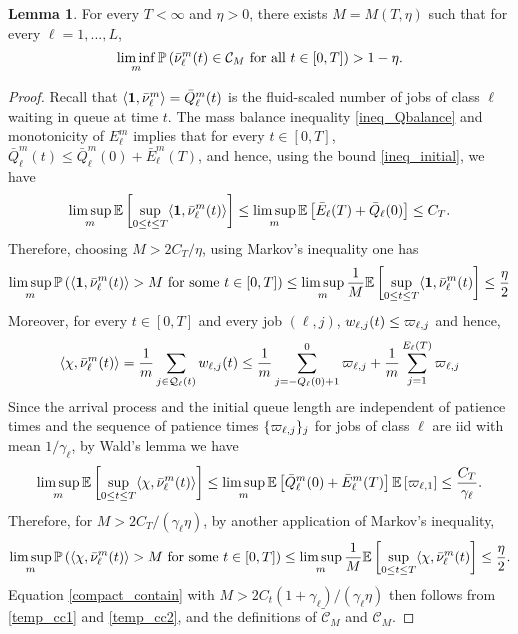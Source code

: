 \documentclass{article}
\theoremstyle{definition}
\newtheorem{lemma}[theorem]{Lemma}
\numberwithin{equation}{section}
\begin{document}
\begin{lemma}\label{lem_nuK1}
  For every $T<\infty$ and $\eta>0$, there exists $M=M(T,\eta)$ such that for every $\ell=1,...,L$,
  \begin{equation}\label{compact_contain}
    \liminf_{m}\mathbb{P}\left(\bar{\nu}_\ell^m(t)\in \mathcal{C}_{M}\text{ for all }t\in[0,T] \right)>1-\eta.
  \end{equation}
\end{lemma}
\begin{proof}
  Recall that $\langle \f1,\bnu^m_\ell\rangle = \bar Q_\ell^m(t)$ is the fluid-scaled number of jobs of class $\ell$ waiting in queue at time $t$. The mass balance inequality \eqref{ineq_Qbalance} and monotonicity of $E^m_\ell$ implies that for every $t\in[0,T]$, $\bar Q_\ell^m(t)\leq \bar Q_\ell^m(0)+ \bar E^m_\ell(T)$, and hence, using the bound \eqref{ineq_initial}, we have
  \[
  \limsup_{m}\Ept{\sup_{0\leq t\leq T}\langle\f1,\bnu^m_\ell(t)\rangle}\leq \limsup_{m}\Ept{\bar\arrival_\ell(T)+ \bql_\ell(0)}\leq C_T.
  \]
  Therefore, choosing $M>2C_T/\eta$, using Markov's inequality one has
  \begin{equation}\label{temp_cc1}
    \limsup_m\Prob{\langle\f1,\bnu^m_\ell(t)\rangle >M \text{ for some }t\in[0,T] }\leq \limsup_m \frac{1}{M}\Ept{\sup_{0\leq t\leq T}\langle\f1,\bnu^m_\ell(t)}\leq \frac{\eta}{2}
  \end{equation}
  Moreover, for every  $t\in[0,T]$ and every job $(\ell,j)$,  $w_{\ell,j}(t)\leq \varpi_{\ell,j}$  and hence,
  \[
  \langle\chi,\bar{\nu}_\ell^m(t)\rangle =\frac{1}{m}\sum_{j\in\mathcal{Q}_\ell(t)}w_{\ell,j}(t) \leq \frac{1}{m}\sum_{j=-Q_\ell(0)+1}^{0}\varpi_{\ell,j}+\frac{1}{m}\sum_{j=1}^{E_\ell(T)} \varpi_{\ell,j}
  \]
  Since the arrival process and the initial queue length are independent of patience times and the sequence of patience times $\{\varpi_{\ell,j}\}_j$ for jobs of class $\ell$ are iid with mean $1/\gamma_\ell$,  by Wald's lemma \cite[Proposition A.10.2]{Asm03} we have
  \[\limsup_{m}\mathbb{E}\left[\sup_{0\leq t\leq T}\langle\chi,\bar{\nu}^m_\ell(t)\rangle\right]\leq  \limsup_m \mathbb{E}\left[\bar {Q}^m_\ell(0)+\bar{E}^m_\ell(T)\right] \mathbb{E}\left[\varpi_{\ell,1}\right]\leq \frac{C_T}{\gamma_\ell}.\]
  Therefore, for $M>2C_T/(\gamma_\ell\eta)$, by another application of Markov's inequality,
  \begin{equation}\label{temp_cc2}
  \limsup_m\mathbb{P}\left(\langle\chi,\bar{\nu}^m_\ell(t)\rangle >M \text{ for some }t\in[0,T] \right)\leq \limsup_m \frac{1}{M}\mathbb{E}\left[\sup_{0\leq t\leq T}\langle\chi,\bar{\nu}^m_\ell(t)\right]\leq \frac{\eta}{2}.
  \end{equation}
  Equation \eqref{compact_contain} with $M>2C_t(1+\gamma_\ell)/(\gamma_\ell\eta)$ then follows from \eqref{temp_cc1} and \eqref{temp_cc2}, and the definitions of $\tilde{\mathcal{C}}_M$ and $\mathcal{C}_M$.
\end{proof}
\end{document}
